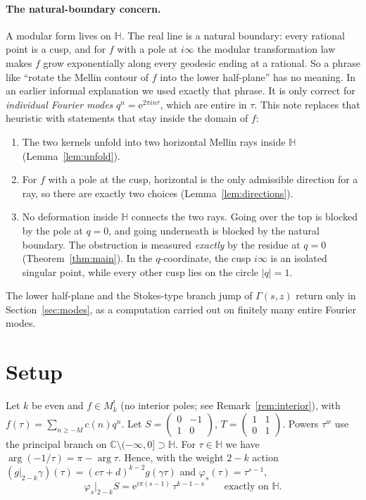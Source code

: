 \documentclass[11pt]{article}
\theoremstyle{definition}
\theoremstyle{remark}
\newcommand{\HH}{\mathbb{H}}
\newcommand{\CC}{\mathbb{C}}
\newcommand{\e}{\mathrm{e}}
\begin{document}
\paragraph{The natural-boundary concern.}

A modular form lives on $\HH$. The real line is a natural boundary: every rational
point is a cusp, and for $f$ with a pole at $i\infty$ the modular transformation law
makes $f$ grow exponentially along every geodesic ending at a rational. So a phrase
like ``rotate the Mellin contour of $f$ into the lower half-plane'' has no meaning.
In an earlier informal explanation we used exactly that phrase. It is only correct
for \emph{individual Fourier modes} $q^n=\e^{2\pi i n\tau}$, which are entire in $\tau$.
This note replaces that heuristic with statements that stay inside the domain of $f$:
\begin{enumerate}
\item The two kernels unfold into two horizontal Mellin rays inside $\HH$
  (Lemma~\ref{lem:unfold}).
\item For $f$ with a pole at the cusp, horizontal is the only admissible direction for
  a ray, so there are exactly two choices (Lemma~\ref{lem:directions}).
\item No deformation inside $\HH$ connects the two rays. Going over the top is
  blocked by the pole at $q=0$, and going underneath is blocked by the natural
  boundary. The obstruction is measured \emph{exactly} by the residue at $q=0$
  (Theorem~\ref{thm:main}). In the $q$-coordinate, the cusp $i\infty$ is an isolated
  singular point, while every other cusp lies on the circle $|q|=1$.
\end{enumerate}
The lower half-plane and the Stokes-type branch jump of $\Gamma(s,z)$ return only in
Section~\ref{sec:modes}, as a computation carried out on finitely many entire
Fourier modes.

\section{Setup}

Let $k$ be even and $f\in M^!_k$ (no interior poles; see Remark~\ref{rem:interior}),
with $f(\tau)=\sum_{n\ge -M}c(n)q^n$. Let $S=\left(\begin{smallmatrix}0&-1\\1&0\end{smallmatrix}\right)$,
$T=\left(\begin{smallmatrix}1&1\\0&1\end{smallmatrix}\right)$. Powers $\tau^w$ use the principal
branch on $\CC\setminus(-\infty,0]\supset\HH$. For $\tau\in\HH$ we have
$\arg(-1/\tau)=\pi-\arg\tau$. Hence, with the weight $2-k$ action
$(g|_{2-k}\gamma)(\tau)=(c\tau+d)^{k-2}g(\gamma\tau)$ and $\varphi_s(\tau)=\tau^{s-1}$,
\begin{equation}\label{eq:phiS}
\varphi_s|_{2-k}S=\e^{i\pi(s-1)}\,\tau^{k-1-s}\qquad\text{exactly on }\HH .
\end{equation}
\end{document}
